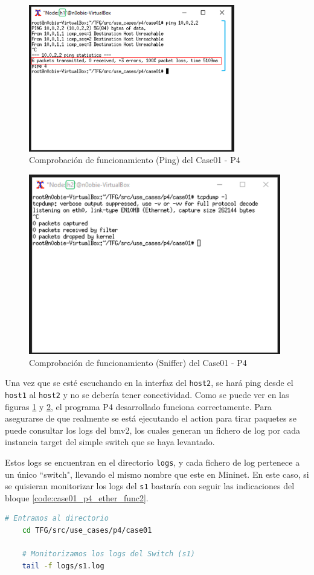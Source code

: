 \begin{figure}[ht]
    \centering
    \includegraphics[width=9cm]{archivos/img/dev/p4/case01/demo_case01_1_edited.png}
    \caption{Comprobación de funcionamiento (Ping) del Case01 - P4}
    \label{fig:case01_p4_ether_func1}
\end{figure}
\newpage
\begin{figure}[ht]
    \centering
    \includegraphics[width=11cm]{archivos/img/dev/p4/case01/demo_case01_2_edited.png}
    \caption{Comprobación de funcionamiento (Sniffer) del Case01 - P4}
    \label{fig:case01_p4_ether_func2}
\end{figure}


Una vez que se esté escuchando en la interfaz del \texttt{host2}, se hará ping \hspace{1mm} desde el \texttt{host1} al \texttt{host2} y no se debería tener conectividad. Como se puede ver en las figuras \ref{fig:case01_p4_ether_func1} y \ref{fig:case01_p4_ether_func2}, el programa P4 desarrollado funciona correctamente. Para asegurarse de que realmente se está ejecutando el action para tirar paquetes se puede consultar los logs del \gls{bmv2}, los cuales generan un fichero de log por cada instancia target del simple switch que se haya levantado. \\
\par
Estos logs se encuentran en el directorio \texttt{logs}, y cada fichero de log pertenece a un único ``switch", llevando el mismo nombre que este en Mininet. En este caso, si se quisieran monitorizar los logs del \texttt{s1} bastaría con seguir las indicaciones del bloque \ref{code:case01_p4_ether_func2}.

\begin{lstlisting}[language= bash, style=Consola, caption={Comprobación de funcionamiento - Case01},label=code:case01_p4_ether_func2]
    # Entramos al directorio 
    cd TFG/src/use_cases/p4/case01

    # Monitorizamos los logs del Switch (s1) 
    tail -f logs/s1.log
\end{lstlisting}